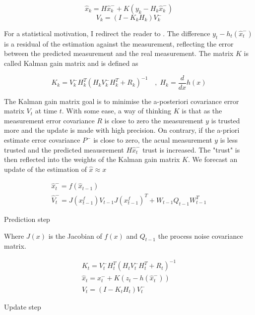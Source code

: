 \documentclass[mscthesis]{usiinfthesis}
\begin{document}
\[
\hat{x}_k = H\hat{x}_k^- + K (y_k - H_k \hat{x}_k^-)
\]
\[
V_k = (I-K_k H_k)V_k^-
\]


For a statistical motivation, I redirect the reader to \citet{paper:Maybeck79}. The difference $y_t - h_t(\hat{x}_t^-)$ is a residual of the estimation against the measurement, reflecting the error between the predicted measurement and the real measurement. The matrix $K$ is called Kalman gain matrix and is defined as 

\[
K_k = V_k^- H^T_k (H_k V_k^- H^T_k + R_k)^{-1}  \quad , \; H_k = \frac{d}{dx} h(x)
\]

The Kalman gain matrix goal is to minimise the a-posteriori covariance error matrix $V_t$ at time $t$. With some ease, a way of thinking $K$ is that as the measurement error covariance $R$ is close to zero the measurement $y$ is trusted more and the update is made with high precision. On contrary, if the a-priori estimate error covariance $P^-$ is close to zero, the acual measurement $y$ is less trusted and the predicted meausrement $H\hat{x}_t^-$ trust is increased. The "trust" is then reflected into the weights of the Kalman gain matrix $K$. We forecast an update of the estimation of $\hat{x} \approx x$


\begin{eqfloat}
\begin{equation}
\begin{array}{l}
\hat{x}_t^- = f(\hat{x}_{t-1}) \\
\hat{V}_t^- = J(x^f_{t-1}) V_{t-1} J(x^f_{t-1})^T + W_{t-1} Q_{t-1} W_{t-1}^T
\end{array}
\label{eq:kalman_predict}
\end{equation}
\caption{Prediction step}
\end{eqfloat}

Where $J(x)$ is the Jacobian of $f(x)$ and $Q_{t-1}$ the process noise covariance matrix.


\begin{eqfloat}
\begin{equation}
\begin{array}{l}
K_t = V_t^- H^T_t (H_t V_t^- H^T_t + R_t)^{-1} \\
\hat{x}_t = x_t^- + K (z_t - h(\hat{x}_t^-)) \\
V_t = (I-K_t H_t)V_t^-
\end{array}
\label{eq:kalman_update}
\end{equation}
\caption{Update step}
\end{eqfloat}
\end{document}
